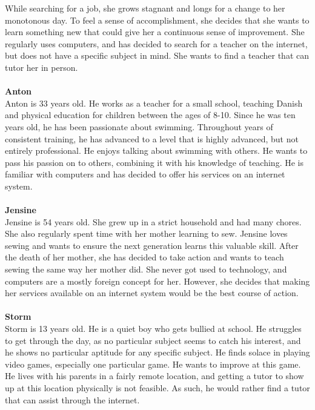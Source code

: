 While searching for a job, she grows stagnant and longs for a change to her monotonous day.
To feel a sense of accomplishment, she decides that she wants to learn something new that could give her a continuous sense of improvement.
She regularly uses computers, and has decided to search for a teacher on the internet, but does not have a specific subject in mind.
She wants to find a teacher that can tutor her in person.
\\\\
\textbf{Anton}
\\
Anton is 33 years old.
He works as a teacher for a small school, teaching Danish and physical education for children between the ages of 8-10.
Since he was ten years old, he has been passionate about swimming.
Throughout years of consistent training, he has advanced to a level that is highly advanced, but not entirely professional.
He enjoys talking about swimming with others.
He wants to pass his passion on to others, combining it with his knowledge of teaching.
He is familiar with computers and has decided to offer his services on an internet system.
\\\\
\textbf{Jensine}
\\
Jensine is 54 years old.
She grew up in a strict household and had many chores.
She also regularly spent time with her mother learning to sew.
Jensine loves sewing and wants to ensure the next generation learns this valuable skill.
After the death of her mother, she has decided to take action and wants to teach sewing the same way her mother did.
She never got used to technology, and computers are a mostly foreign concept for her.
However, she decides that making her services available on an internet system would be the best course of action.
\\\\
\textbf{Storm}
\\
Storm is 13 years old.
He is a quiet boy who gets bullied at school. 
He struggles to get through the day, as no particular subject seems to catch his interest, and he shows no particular aptitude for any specific subject.
He finds solace in playing video games, especially one particular game. 
He wants to improve at this game.
He lives with his parents in a fairly remote location, and getting a tutor to show up at this location physically is not feasible.
As such, he would rather find a tutor that can assist through the internet.

